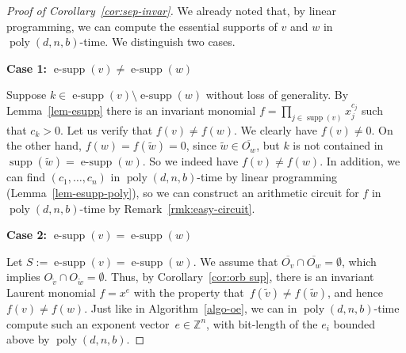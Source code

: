 \documentclass[10pt,a4paper]{article}
\DeclareMathOperator{\supp}{supp}
\DeclareMathOperator{\esupp}{e-supp}
\DeclareMathOperator{\poly}{poly}
\theoremstyle{definition}
\numberwithin{equation}{section}
\newcommand{\ZZ}{\mathbb{Z}}
\begin{document}
\begin{proof} [Proof of Corollary~\ref{cor:sep-invar}]
We already noted that, by linear programming, we can compute the essential supports of $v$ and $w$
in $\poly(d,n,b)$-time. We distinguish two cases.

\textbf{Case 1:} $\esupp(v) \ne \esupp(w)$

\noindent
Suppose $k \in \esupp(v) \setminus \esupp(w)$ without loss of generality.
By Lemma~\ref{lem-esupp} there is an invariant monomial $f = \prod_{j \in \supp(v)} x_j^{c_j}$ such that $c_k > 0$.
Let us verify that $f(v) \ne f(w)$.
We clearly have $f(v)\ne 0$.
On the other hand, $f(w)=f(\widetilde{w})=0$, since $\widetilde{w} \in \overline{O_w}$, but $k$ is not contained in $\supp(\widetilde{w})=\esupp(w)$.
So we indeed have $f(v) \ne f(w)$.
In addition, we can find $(c_1,\dots,c_n)$ in $\poly(d,n,b)$-time by linear programming (Lemma~\ref{lem-esupp-poly}),
so we can construct an arithmetic circuit for $f$ in $\poly(d,n,b)$-time by Remark~\ref{rmk:easy-circuit}.

\medskip

{\bf Case 2:} $\esupp(v) =\esupp(w)$

\noindent
Let $S := \esupp(v) =\esupp(w)$.
We assume that $\overline{O_v} \cap \overline{O_w} = \emptyset$, which implies $O_{\widetilde{v}} \cap O_{\widetilde{w}} = \emptyset$.
Thus, by Corollary~\ref{cor:orb sup}, there is an invariant Laurent monomial $f = x^e$ with the property that~$f(\widetilde v) \neq f(\widetilde w)$, and hence $f(v) \neq f(w)$.
Just like in Algorithm~\ref{algo-oe}, we can in $\poly(d,n,b)$-time compute such an exponent vector~$e\in\ZZ^n$, with bit-length of the $e_i$ bounded above by $\poly(d,n,b)$.


\end{proof}
\end{document}

